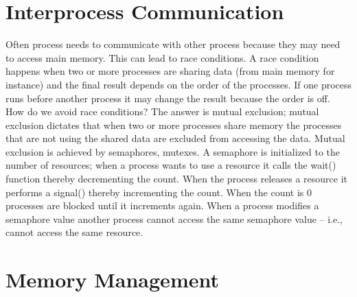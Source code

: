 \documentclass{amsbook}
\begin{document}
\section{Interprocess Communication}

Often process needs to communicate with other process because they may need to access main memory. This can lead to race conditions. A race condition happens when two or more processes are sharing data (from main memory for instance) and the final result depends on the order of the processes. If one process runs before another process it may change the result because the order is off. How do we avoid race conditions? The answer is mutual exclusion; mutual exclusion dictates that when two or more processes share memory the processes that are not using the shared data are excluded from accessing the data. Mutual exclusion is achieved by semaphores, mutexes. A semaphore is initialized to the number of resources; when a process wants to use a resource it calls the wait() function thereby decrementing the count. When the process releases a resource it performs a signal() thereby incrementing the count. When the count is 0 processes are blocked until it increments again. When a process modifies a semaphore value another process cannot access the same semaphore value -- i.e., cannot access the same resource.

\section{Memory Management}
\end{document}
